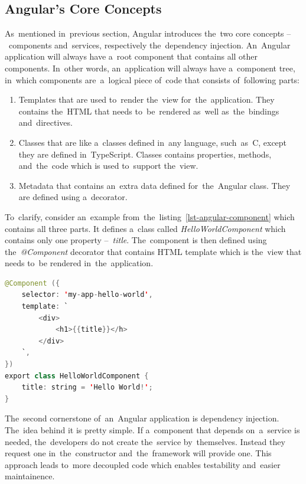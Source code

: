 \subsection{Angular's Core Concepts}
As~mentioned in~previous section, Angular introduces the~two core concepts
--~components and~services, respectively the~dependency injection. An~Angular
application will always have a~root component that contains all other
components. In~other words, an~application will always have a~component tree,
in~which components are~a~logical piece of~code that consists of~following
parts:

\begin{enumerate}
  \item Templates that are used to~render the~view for~the~application. They
  contains the~HTML that needs to~be~rendered as~well as~the~bindings
  and~directives.
  \item Classes that are like a~classes defined in~any language, such~as~C,
  except they are defined in~TypeScript. Classes contains properties, methods,
  and~the~code which is used to~support the~view.
  \item Metadata that contains an~extra data defined for~the~Angular class. They
  are defined using a~decorator.
\end{enumerate}

To~clarify, consider an~example from~the~listing~\ref{lst-angular-component}
which contains all three parts. It defines a~class called
\textit{HelloWorldComponent} which contains only one property --~\textit{title}.
The~component is then defined using the~\textit{@Component} decorator that
contains HTML template which is the~view that needs to~be rendered
in~the~application.

\pagebreak
\begin{lstlisting}[caption=An~Angular class with~the~\textit{@Component}
decorator and~a~HTML template., label=lst-angular-component, style=dp-default,
language=Java]
@Component ({
	selector: 'my-app-hello-world',
	template: `
		<div>
			<h1>{{title}}</h>
		</div>
	`,
})
export class HelloWorldComponent {
	title: string = 'Hello World!';
}
\end{lstlisting}

The~second cornerstone of~an~Angular application is dependency injection.
The~idea behind it is pretty simple. If a~component that depends on~a~service is
needed, the~developers do not create the~service by~themselves. Instead they
request one in~the~constructor and~the~framework will provide one. This approach
leads to~more decoupled code which enables testability and~easier maintainence.

